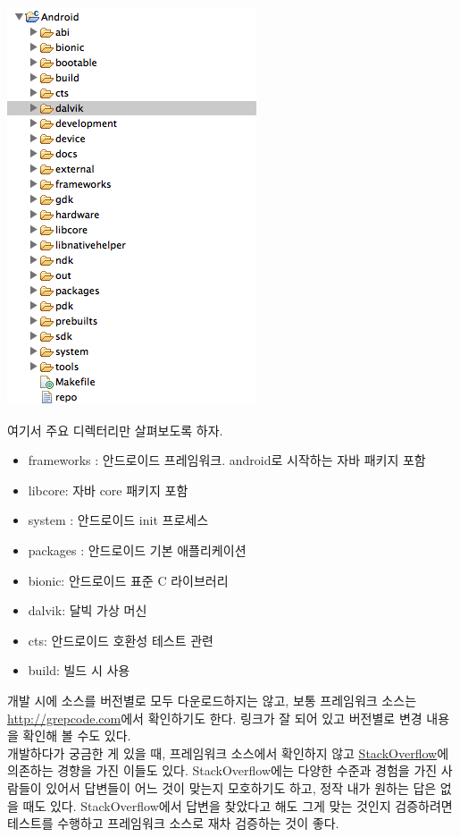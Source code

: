 \includegraphics[scale=0.7]{sourcetree}

여기서 주요 디렉터리만 살펴보도록 하자.
\begin{itemize}
\item frameworks : 안드로이드 프레임워크. android로 시작하는 자바 패키지 포함
\item libcore: 자바 core 패키지 포함
\item system : 안드로이드 init 프로세스
\item packages : 안드로이드 기본 애플리케이션
\item bionic: 안드로이드 표준 C 라이브러리
\item dalvik: 달빅 가상 머신
\item cts: 안드로이드 호환성 테스트 관련
\item build: 빌드 시 사용
\end{itemize}

개발 시에 소스를 버전별로 모두 다운로드하지는 않고, 보통 프레임워크 소스는 
\url{http://grepcode.com}에서 확인하기도 한다. 링크가 잘 되어 있고 버전별로 변경 내용을 확인해 볼 수도 있다.\\

개발하다가 궁금한 게 있을 때, 프레임워크 소스에서 확인하지 않고 \href{http://stackoverlow.com}{StackOverflow}에 의존하는 경향을 가진 이들도 있다. %
StackOverflow에는 다양한 수준과 경험을 가진 사람들이 있어서 답변들이 어느 것이 맞는지 모호하기도 하고, 정작 내가 원하는 답은 없을 때도 있다.
StackOverflow에서 답변을 찾았다고 해도 그게 맞는 것인지 검증하려면 테스트를 수행하고 프레임워크 소스로 재차 검증하는 것이 좋다.\\

